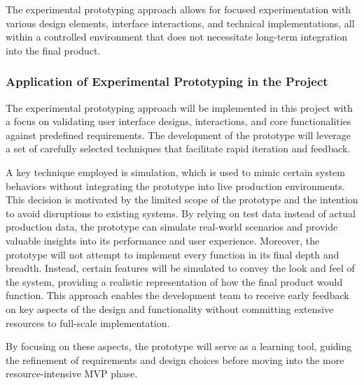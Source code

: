The experimental prototyping approach allows for focused experimentation with various design elements, interface
interactions, and technical implementations, all within a controlled environment that does not necessitate long-term
integration into the final product.

\subsubsection{Application of Experimental Prototyping in the Project}\label{subsubsec:ptapplication}

The experimental prototyping approach will be implemented in this project with a focus on validating user interface
designs, interactions, and core functionalities against predefined requirements. The development of the prototype will
leverage a set of carefully selected techniques that facilitate rapid iteration and feedback.

A key technique employed is simulation, which is used to mimic certain system behaviors without integrating the
prototype into live production environments. This decision is motivated by the limited scope of the prototype and the
intention to avoid disruptions to existing systems. By relying on test data instead of actual production data, the
prototype can simulate real-world scenarios and provide valuable insights into its performance and user experience.
Moreover, the prototype will not attempt to implement every function in its final depth and breadth. Instead, certain
features will be simulated to convey the look and feel of the system, providing a realistic representation of how the
final product would function. This approach enables the development team to receive early feedback on key aspects of the
design and functionality without committing extensive resources to full-scale implementation.

By focusing on these aspects, the prototype will serve as a learning tool, guiding the refinement of requirements and
design choices before moving into the more resource-intensive MVP phase.
